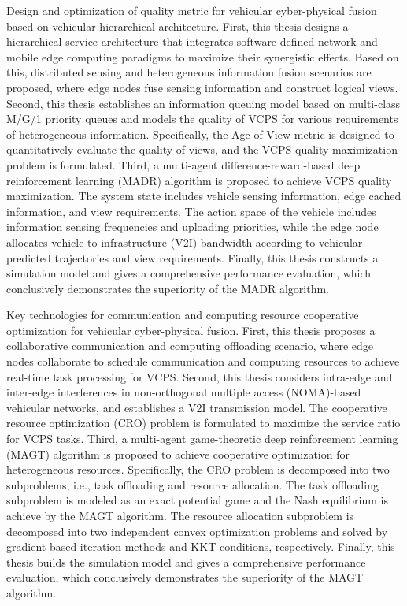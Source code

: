 \begin{eabstract}
 Design and optimization of quality metric for vehicular cyber-physical fusion based on vehicular hierarchical architecture. First, this thesis designs a hierarchical service architecture that integrates software defined network and mobile edge computing paradigms to maximize their synergistic effects. Based on this, distributed sensing and heterogeneous information fusion scenarios are proposed, where edge nodes fuse sensing information and construct logical views. Second, this thesis establishes an information queuing model based on multi-class M/G/1 priority queues and models the quality of VCPS for various requirements of heterogeneous information. Specifically, the Age of View metric is designed to quantitatively evaluate the quality of views, and the VCPS quality maximization problem is formulated. Third, a multi-agent difference-reward-based deep reinforcement learning (MADR) algorithm is proposed to achieve VCPS quality maximization. The system state includes vehicle sensing information, edge cached information, and view requirements. The action space of the vehicle includes information sensing frequencies and uploading priorities, while the edge node allocates vehicle-to-infrastructure (V2I) bandwidth according to vehicular predicted trajectories and view requirements. Finally, this thesis constructs a simulation model and gives a comprehensive performance evaluation, which conclusively demonstrates the superiority of the MADR algorithm.

 Key technologies for communication and computing resource cooperative optimization for vehicular cyber-physical fusion. First, this thesis proposes a collaborative communication and computing offloading scenario, where edge nodes collaborate to schedule communication and computing resources to achieve real-time task processing for VCPS. Second, this thesis considers intra-edge and inter-edge interferences in non-orthogonal multiple access (NOMA)-based vehicular networks, and establishes a V2I transmission model. The cooperative resource optimization (CRO) problem is formulated to maximize the service ratio for VCPS tasks. Third, a multi-agent game-theoretic deep reinforcement learning (MAGT) algorithm is proposed to achieve cooperative optimization for heterogeneous resources. Specifically, the CRO problem is decomposed into two subproblems, i.e., task offloading and resource allocation. The task offloading subproblem is modeled as an exact potential game and the Nash equilibrium is achieve by the MAGT algorithm. The resource allocation subproblem is decomposed into two independent convex optimization problems and solved by gradient-based iteration methods and KKT conditions, respectively. Finally, this thesis builds the simulation model and gives a comprehensive performance evaluation, which conclusively demonstrates the superiority of the MAGT algorithm.


\end{eabstract}
